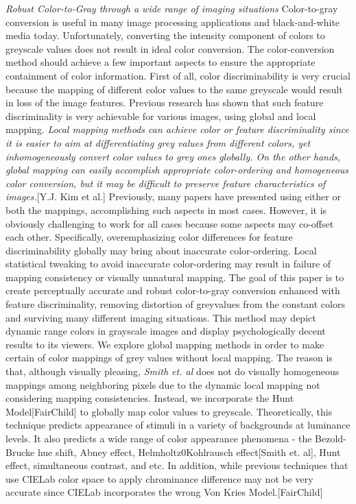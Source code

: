 \documentclass{article}
\begin{document}
{\it Robust Color-to-Gray through a wide range of imaging situations}
Color-to-gray conversion is useful in many image processing applications and black-and-white media today. Unfortunately, converting the intensity component of colors to greyscale values does not result in ideal color conversion. The color-conversion method should achieve a few important aspects to ensure the appropriate containment of color information. First of all, color discriminability is very crucial because the mapping of different color values to the same greyscale would result in loss of the image features. Previous research has shown that such feature discriminality is very achievable for various images, using global and local mapping. {\it Local mapping methods can achieve color or feature discriminality since it is easier to aim at differentiating grey values from different colors, yet inhomogeneously convert color values to grey ones globally. On the other hands, global mapping can easily accomplish appropriate color-ordering and homogeneous color conversion, but it may be difficult to preserve feature characteristics of images.}[Y.J. Kim et al.] Previously, many papers have presented using either or both the mappings, accomplishing such aspects in most cases. However, it is obviously challenging to work for all cases because some aspects may co-offset each other. Specifically, overemphasizing color differences for feature discriminability globally may bring about inaccurate color-ordering. Local statistical tweaking to avoid inaccurate color-ordering may result in failure of mapping consistency or visually unnatural mapping.\newline
The goal of this paper is to create perceptually accurate and robust color-to-gray conversion enhanced with feature discriminality, removing distortion of greyvalues from the constant colors and surviving many different imaging situations. This method may depict dynamic range colors in grayscale images and display psychologically decent results to its viewers. We explore global mapping methods in order to make certain of color mappings of grey values without local mapping. The reason is that, although visually pleasing, {\it Smith et. al} does not do visually homogeneous mappings among neighboring pixels due to the dynamic local mapping not considering mapping consistencies. Instead, we incorporate the Hunt Model[FairChild] to globally map color values to greyscale. Theoretically, this technique predicts appearance of stimuli in a variety of backgrounds at luminance levels. It also predicts a wide range of color appearance phenomena - the Bezold-Brucke hue shift, Abney effect, Helmholtz0Kohlrausch effect[Smith et. al], Hunt effect, simultaneous contrast, and etc. In addition, while previous techniques that use CIELab color space to apply chrominance difference may not be very accurate since CIELab incorporates the wrong Von Kries Model.[FairChild]\newline
\end{document}
